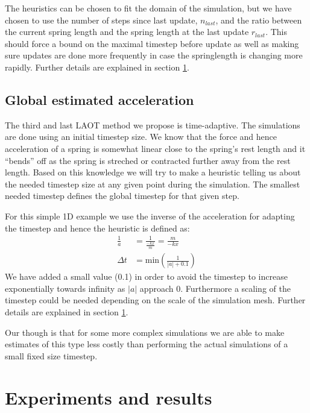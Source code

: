 \documentclass[11pt]{article}
\providecommand{\abs}[1]{\left \lvert #1 \right \rvert}
\begin{document}
The heuristics can be chosen to fit the domain of the simulation, but we
have chosen to use the number of steps since last update, $n_{last}$, and
the ratio between the current spring length and the spring length at the
last update $r_{last}$. This should force a bound on the maximal timestep
before update as well as making sure updates are done more frequently in case
the springlength is changing more rapidly. Further details are explained in
section \ref{sec:experiments}.

\subsection{Global estimated acceleration}
The third and last LAOT method we propose is time-adaptive. The simulations are
done using an initial timestep size. We know that the force and hence
acceleration of a spring is somewhat linear close to the spring's rest length
and it ``bends'' off as the spring is streched or contracted further away from
the rest length. Based on this knowledge we will try to make a heuristic
telling us about the needed timestep size at any given point during the
simulation. The smallest needed timestep defines the global timestep for that
given step.

For this simple 1D example we use the inverse of the acceleration
for adapting the timestep and hence the heuristic is defined as:
\begin{align}
    \frac{1}{a} &= \frac{1}{\frac{-kx}{m}} = \frac{m}{-kx} \\
    \Delta t &= \text{min}\left( \frac{1}{\abs{a} + 0.1} \right )
\end{align}
We have added a small value (0.1) in order to avoid the timestep to increase
exponentially towards infinity as $\abs{a}$ approach 0. Furthermore a scaling
of the timestep could be needed depending on the scale of the simulation mesh.
Further details are explained in section \ref{sec:experiments}.

Our though is that for some more
complex simulations we are able to make estimates of this type less costly than
performing the actual simulations of a small fixed size timestep.


\section{Experiments and results}
\label{sec:experiments}
\end{document}
